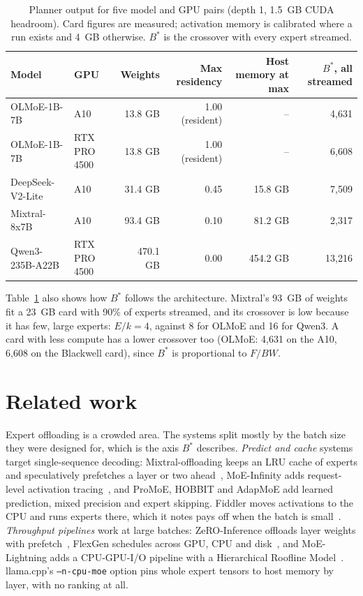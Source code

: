 \documentclass[10pt,a4paper]{article}
\begin{document}
\begin{table}[htbp]
\centering\small
\caption{Planner output for five model and GPU pairs (depth 1, 1.5~GB CUDA headroom).
Card figures are measured; activation memory is calibrated where a run exists and
4~GB otherwise. $B^{*}$ is the crossover with every expert streamed.}
\label{tab:plans}
\begin{tabular}{llrrrr}
\toprule
Model & GPU & Weights & Max residency & Host memory at max & $B^{*}$, all streamed \\
\midrule
OLMoE-1B-7B      & A10            & 13.8 GB  & 1.00 (resident) & --       & 4{,}631 \\
OLMoE-1B-7B      & RTX PRO 4500   & 13.8 GB  & 1.00 (resident) & --       & 6{,}608 \\
DeepSeek-V2-Lite & A10            & 31.4 GB  & 0.45            & 15.8 GB  & 7{,}509 \\
Mixtral-8x7B     & A10            & 93.4 GB  & 0.10            & 81.2 GB  & 2{,}317 \\
Qwen3-235B-A22B  & RTX PRO 4500   & 470.1 GB & 0.00            & 454.2 GB & 13{,}216 \\
\bottomrule
\end{tabular}
\end{table}

Table~\ref{tab:plans} also shows how $B^{*}$ follows the architecture. Mixtral's
93~GB of weights fit a 23~GB card with 90\% of experts streamed, and its crossover
is low because it has few, large experts: $E/k = 4$, against 8 for OLMoE and 16 for
Qwen3. A card with less compute has a lower crossover too (OLMoE: 4{,}631 on the
A10, 6{,}608 on the Blackwell card), since $B^{*}$ is proportional to $F/BW$.

\section{Related work}

Expert offloading is a crowded area. The systems split mostly by the batch size
they were designed for, which is the axis $B^{*}$ describes. \emph{Predict and
cache} systems target single-sequence decoding: Mixtral-offloading keeps an LRU
cache of experts and speculatively prefetches a layer or two ahead~\cite{mixoff},
MoE-Infinity adds request-level activation tracing~\cite{moeinf}, and ProMoE,
HOBBIT and AdapMoE add learned prediction, mixed precision and expert skipping.
Fiddler moves activations to the CPU and runs experts there, which it notes pays
off when the batch is small~\cite{fiddler}. \emph{Throughput pipelines} work at
large batches: ZeRO-Inference offloads layer weights with prefetch~\cite{dsinf},
FlexGen schedules across GPU, CPU and disk~\cite{flexgen}, and MoE-Lightning adds
a CPU-GPU-I/O pipeline with a Hierarchical Roofline Model~\cite{moelight}. llama.cpp's
\texttt{--n-cpu-moe} option pins whole expert tensors to host memory by layer,
with no ranking at all.
\end{document}
